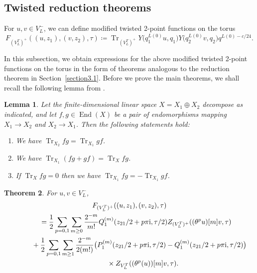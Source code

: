 \documentclass[pdftex]{sigma}
\numberwithin{equation}{section}
\newtheorem{Theorem}{Theorem}[section]
\newtheorem{Lemma}[Theorem]{Lemma}
\theoremstyle{definition}
\begin{document}
\subsection{Twisted reduction theorems}

For $u,v\in V_L^-$, we can define modified twisted 2-point functions on the torus
\[F_{(V_L^T)^+}((u,z_1),(v,z_2),\tau)\coloneqq \operatorname{Tr}_{(V_L^T)^+}Y\bigl(q_1^{L(0)}u,q_1\bigr)Y\bigl(q_2^{L(0)}v,q_2\bigr)q^{L(0)-c/24}.\]

In this subsection, we obtain expressions for the above modified twisted 2-point functions on the torus in the form of theorems analogous to the reduction theorem in Section~\ref{section3.1}. Before we prove the main theorems, we shall recall the following lemma from \cite[Lemma~12]{Mason20231-PointAlgebras}.

\begin{Lemma}\label{Lemma 12 from MM}
 Let the finite-dimensional linear space $X=X_1\oplus X_2$ decompose as indicated, and let $f,g\in \operatorname{End}(X)$ be a pair of endomorphisms mapping $X_1\to X_2$ and $X_2\to X_1$. Then the following statements hold:
 \begin{enumerate}\itemsep=0pt
 \item[$(1)$] We have $\operatorname{Tr}_{X_2}fg=\operatorname{Tr}_{X_1}gf$.
 \item[$(2)$] We have $\operatorname{Tr}_{X_1}(fg+gf)=\operatorname{Tr}_{X}fg$.
 \item[$(3)$] If $\operatorname{Tr}_X fg=0$ then we have $\operatorname{Tr}_{X_1}fg=-\operatorname{Tr}_{X_1}gf$.
 \end{enumerate}
\end{Lemma}

\begin{Theorem}\label{Z2 Twisted+ Reduction Theorem 1}
 For $u,v\in V_L^-$,
 \begin{gather*}
 F_{(V_L^T)^+}((u,z_1),(v,z_2),\tau)\\
 \qquad=\frac{1}{2}\sum_{p=0,1}\sum_{m\geq 0}\frac{2^{-m}}{m!} Q_1^{(m)}(z_{21}/2+p\pi {\rm i},\tau/2) Z_{(V_L^T)^+}((\theta^pu)[m]v,\tau)\\
 \phantom{\qquad=}{}+\frac{1}{2}\sum_{p=0,1}\sum_{m\geq 1}\frac{2^{-m}}{2(m!)}\bigl( P_1^{(m)}(z_{21}/2+p\pi {\rm i},\tau/2)-Q_1^{(m)}(z_{21}/2+p\pi {\rm i},\tau/2)\bigr) \\
 \phantom{\qquad=+}{}\times Z_{V_L^T}((\theta^p(u))[m]v, \tau).
 \end{gather*}
\end{Theorem}
\end{document}
